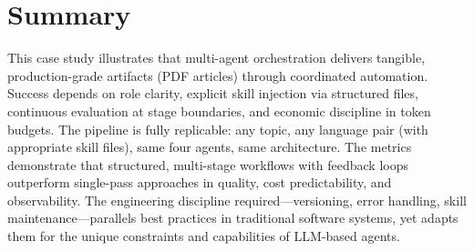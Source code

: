 \section{Summary}\label{sec:casestudy_summary}

This case study illustrates that multi-agent orchestration delivers tangible, production-grade artifacts (PDF articles) through coordinated automation. Success depends on role clarity, explicit skill injection via structured files, continuous evaluation at stage boundaries, and economic discipline in token budgets. The pipeline is fully replicable: any topic, any language pair (with appropriate skill files), same four agents, same architecture. The metrics demonstrate that structured, multi-stage workflows with feedback loops outperform single-pass approaches in quality, cost predictability, and observability. The engineering discipline required—versioning, error handling, skill maintenance—parallels best practices in traditional software systems, yet adapts them for the unique constraints and capabilities of LLM-based agents.